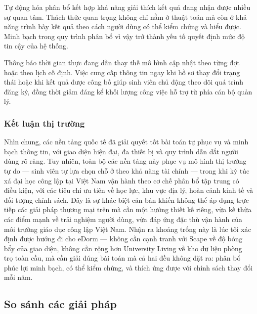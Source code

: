 \documentclass[../DoAn.tex]{subfiles}
\begin{document}
Tự động hóa phân bổ kết hợp khả năng giải thích kết quả đang nhận được nhiều sự
quan tâm. Thách thức quan trọng không chỉ nằm ở thuật toán mà còn ở khả năng
trình bày kết quả theo cách người dùng có thể kiểm chứng và hiểu được. Minh bạch
trong quy trình phân bổ vì vậy trở thành yếu tố quyết định mức độ tin cậy của
hệ thống.

Thông báo thời gian thực đang dần thay thế mô hình cập nhật theo từng đợt hoặc
theo lịch cố định. Việc cung cấp thông tin ngay khi hồ sơ thay đổi trạng thái
hoặc khi kết quả được công bố giúp sinh viên chủ động theo dõi quá trình đăng
ký, đồng thời giảm đáng kể khối lượng công việc hỗ trợ từ phía cán bộ quản lý.


\subsubsection*{Kết luận thị trường}

Nhìn chung, các nền tảng quốc tế đã giải quyết tốt bài toán tự phục vụ và minh
bạch thông tin, với giao diện hiện đại, đa thiết bị và quy trình dẫn dắt người
dùng rõ ràng. Tuy nhiên, toàn bộ các nền tảng này phục vụ mô hình thị trường
tự do --- sinh viên tự lựa chọn chỗ ở theo khả năng tài chính --- trong khi ký
túc xá đại học công lập tại Việt Nam vận hành theo cơ chế phân bổ tập trung
có điều kiện, với các tiêu chí ưu tiên về học lực, khu vực địa lý, hoàn cảnh
kinh tế và đối tượng chính sách. Đây là sự khác biệt căn bản khiến không thể
áp dụng trực tiếp các giải pháp thương mại trên mà cần một hướng thiết kế riêng,
vừa kế thừa các điểm mạnh về trải nghiệm người dùng, vừa đáp ứng đặc thù vận
hành của môi trường giáo dục công lập Việt Nam. Nhận ra khoảng trống này là
lúc tôi xác định được hướng đi cho eDorm --- không cần cạnh tranh với Scape về
độ bóng bẩy của giao diện, không cần rộng hơn University Living về kho dữ liệu
phòng trọ toàn cầu, mà cần giải đúng bài toán mà cả hai đều không đặt ra: phân
bổ phúc lợi minh bạch, có thể kiểm chứng, và thích ứng được với chính sách thay
đổi mỗi năm.

\subsection{So sánh các giải pháp}
\end{document}
